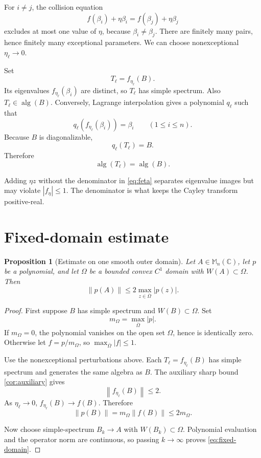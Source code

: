 \documentclass[11pt,oneside,openany]{book}
\newtheorem{proposition}[theorem]{Proposition}
\theoremstyle{definition}
\theoremstyle{remark}
\newcommand{\C}{\mathbb C}
\newcommand{\Mn}{\mathbb M_n(\C)}
\newcommand{\alg}{\operatorname{alg}}
\newcommand{\norm}[1]{\left\lVert #1\right\rVert}
\begin{document}
For \(i\neq j\), the collision equation
\[
  f(\beta_i)+\eta\beta_i
  =f(\beta_j)+\eta\beta_j
\]
excludes at most one value of \(\eta\), because
\(\beta_i\neq\beta_j\).  There are finitely many pairs, hence finitely
many exceptional parameters.  We can choose nonexceptional
\(\eta_\ell\to0\).

Set
\[
  T_\ell=f_{\eta_\ell}(B).
\]
Its eigenvalues
\(
f_{\eta_\ell}(\beta_i)
\)
are distinct, so \(T_\ell\) has simple spectrum.  Also
\(T_\ell\in\alg(B)\).  Conversely, Lagrange interpolation gives a
polynomial \(q_\ell\) such that
\[
  q_\ell(f_{\eta_\ell}(\beta_i))=\beta_i
  \qquad(1\leq i\leq n).
\]
Because \(B\) is diagonalizable,
\[
  q_\ell(T_\ell)=B.
\]
Therefore
\begin{equation}
  \alg(T_\ell)=\alg(B).
  \label{eq:algebra-equality-perturbed}
\end{equation}

\begin{pitfall}
Adding \(\eta z\) without the denominator in \eqref{eq:feta} separates
eigenvalue images but may violate \(|f_\eta|\leq1\).  The denominator
is what keeps the Cayley transform positive-real.
\end{pitfall}

\section{Fixed-domain estimate}

\begin{proposition}[Estimate on one smooth outer domain]
\label{prop:fixed-domain}
Let \(A\in\Mn\), let \(p\) be a polynomial, and let \(\Omega\) be a
bounded convex \(C^1\) domain with \(W(A)\subset\Omega\).  Then
\begin{equation}
  \norm{p(A)}
  \leq2\max_{z\in\overline\Omega}|p(z)|.
  \label{eq:fixed-domain}
\end{equation}
\end{proposition}

\begin{proof}
First suppose \(B\) has simple spectrum and \(W(B)\subset\Omega\).
Set
\[
  m_\Omega=\max_{\overline\Omega}|p|.
\]
If \(m_\Omega=0\), the polynomial vanishes on the open set
\(\Omega\), hence is identically zero.  Otherwise let
\(f=p/m_\Omega\), so \(\max_{\overline\Omega}|f|\leq1\).

Use the nonexceptional perturbations above.  Each
\(T_\ell=f_{\eta_\ell}(B)\) has simple spectrum and generates the
same algebra as \(B\).  The auxiliary sharp bound
\cref{cor:auxiliary} gives
\[
  \norm{f_{\eta_\ell}(B)}\leq2.
\]
As \(\eta_\ell\to0\), \(f_{\eta_\ell}(B)\to f(B)\).  Therefore
\[
  \norm{p(B)}=m_\Omega\norm{f(B)}\leq2m_\Omega.
\]

Now choose simple-spectrum \(B_k\to A\) with
\(W(B_k)\subset\Omega\).  Polynomial evaluation and the operator norm
are continuous, so passing \(k\to\infty\) proves
\eqref{eq:fixed-domain}.
\end{proof}
\end{document}
